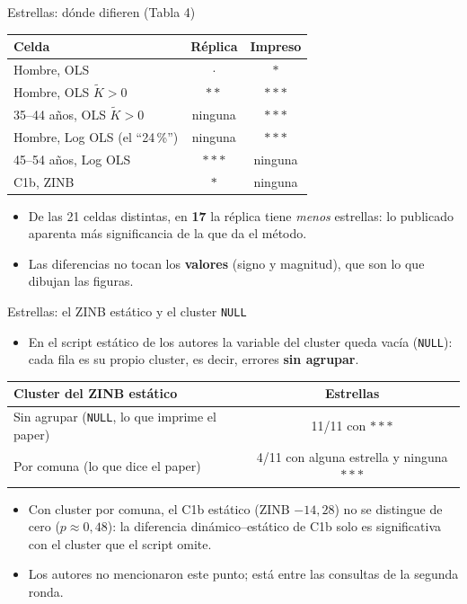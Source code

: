 \documentclass[aspectratio=169,10pt,t]{beamer}
\begin{document}
\begin{frame}{Estrellas: dónde difieren (Tabla 4)}
  \centering\small
  \begin{tabular}{lcc}\toprule
    Celda & Réplica & Impreso \\\midrule
    Hombre, OLS & $\cdot$ & $*$ \\
    Hombre, OLS $\tilde K>0$ & $**$ & $***$ \\
    35--44 años, OLS $\tilde K>0$ & ninguna & $***$ \\
    Hombre, Log OLS (el ``24\,\%'') & ninguna & $***$ \\
    45--54 años, Log OLS & $***$ & ninguna \\
    C1b, ZINB & $*$ & ninguna \\\bottomrule
  \end{tabular}

  \vspace{6pt}
  \begin{flushleft}\footnotesize
    \begin{itemize}
      \item De las 21 celdas distintas, en \textbf{17} la réplica tiene \emph{menos} estrellas: lo publicado aparenta más significancia de la que da el método.
      \item Las diferencias no tocan los \textbf{valores} (signo y magnitud), que son lo que dibujan las figuras.
    \end{itemize}
  \end{flushleft}
\end{frame}

\begin{frame}{Estrellas: el ZINB estático y el cluster \texttt{NULL}}
  \begin{itemize}
    \item En el script estático de los autores la variable del cluster queda vacía (\texttt{NULL}): cada fila es su propio cluster, es decir, errores \textbf{sin agrupar}.
  \end{itemize}
  \centering\small
  \begin{tabular}{lc}\toprule
    Cluster del ZINB estático & Estrellas \\\midrule
    Sin agrupar (\texttt{NULL}, lo que imprime el paper) & 11/11 con $***$ \\
    Por comuna (lo que dice el paper) & 4/11 con alguna estrella y ninguna $***$ \\\bottomrule
  \end{tabular}

  \vspace{6pt}
  \begin{flushleft}\footnotesize
    \begin{itemize}
      \item Con cluster por comuna, el C1b estático (ZINB $-14{,}28$) no se distingue de cero ($p\approx0{,}48$): la diferencia dinámico--estático de C1b solo es significativa con el cluster que el script omite.
      \item Los autores no mencionaron este punto; está entre las consultas de la segunda ronda.
    \end{itemize}
  \end{flushleft}
\end{frame}
\end{document}
